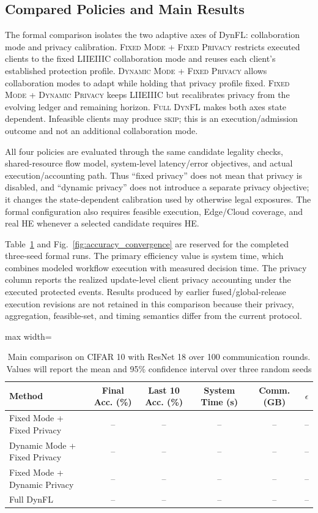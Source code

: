 \documentclass[5p,times]{elsarticle}
\theoremstyle{plain}
\theoremstyle{definition}
\theoremstyle{remark}
\newcommand{\tabref}[1]{Table~\ref{#1}}
\newcommand{\figref}[1]{Fig.~\ref{#1}}
\begin{document}
\subsection{Compared Policies and Main Results}
The formal comparison isolates the two adaptive axes of DynFL: collaboration
mode and privacy calibration. \textsc{Fixed Mode + Fixed Privacy} restricts
executed clients to the fixed LIIEIIIC collaboration mode and reuses each
client's established protection profile. \textsc{Dynamic Mode + Fixed Privacy}
allows collaboration modes to adapt while holding that privacy profile fixed.
\textsc{Fixed Mode + Dynamic Privacy} keeps LIIEIIIC but recalibrates privacy
from the evolving ledger and remaining horizon. \textsc{Full DynFL} makes both
axes state dependent. Infeasible clients may produce \textsc{skip}; this is an
execution/admission outcome and not an additional collaboration mode.

All four policies are evaluated through the same candidate legality checks,
shared-resource flow model, system-level latency/error objectives, and actual
execution/accounting path. Thus ``fixed privacy'' does not mean that privacy is
disabled, and ``dynamic privacy'' does not introduce a separate privacy objective;
it changes the state-dependent calibration used by otherwise legal exposures.
The formal configuration also requires feasible execution, Edge/Cloud coverage,
and real HE whenever a selected candidate requires HE.

\tabref{tab:main_comparison} and \figref{fig:accuracy_convergence} are reserved
for the completed three-seed formal runs. The primary efficiency value is system
time, which combines modeled workflow execution with measured decision time. The
privacy column reports the realized update-level client privacy accounting under
the executed protected events. Results produced by earlier fused/global-release
execution revisions are not retained in this comparison because their privacy,
aggregation, feasible-set, and timing semantics differ from the current protocol.

\begin{table}[t]
\centering
\caption{Main comparison on CIFAR 10 with ResNet 18 over 100 communication rounds. Values will report the mean and 95\% confidence interval over three random seeds}
\label{tab:main_comparison}
\scriptsize
\begin{adjustbox}{max width=\textwidth}
\begin{tabular}{lccccc}
\hline
\textbf{Method} & \textbf{Final Acc. (\%)} & \textbf{Last 10 Acc. (\%)} & \textbf{System Time (s)} & \textbf{Comm. (GB)} & \textbf{$\epsilon$} \\
\hline
Fixed Mode + Fixed Privacy & -- & -- & -- & -- & -- \\
Dynamic Mode + Fixed Privacy & -- & -- & -- & -- & -- \\
Fixed Mode + Dynamic Privacy & -- & -- & -- & -- & -- \\
Full DynFL & -- & -- & -- & -- & -- \\
\hline
\end{tabular}
\end{adjustbox}
\end{table}
\FloatBarrier
\end{document}
